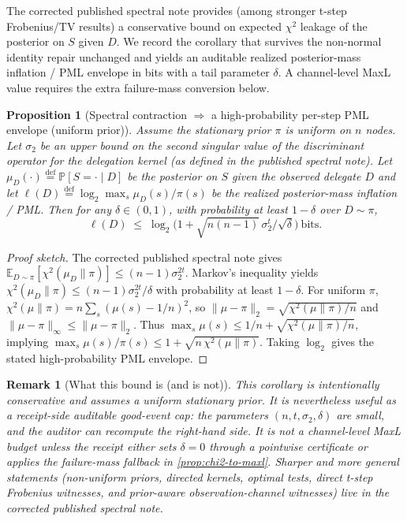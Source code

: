 \documentclass[11pt]{article}
\newtheorem{proposition}{Proposition}
\newtheorem{remark}{Remark}
\newcommand{\PP}{\mathbb{P}}
\newcommand{\EE}{\mathbb{E}}
\newcommand{\defeq}{\stackrel{\mathrm{def}}{=}}
\begin{document}
The corrected published spectral note provides (among stronger t-step Frobenius/TV results) a conservative bound on expected $\chi^2$ leakage of the posterior on $S$ given $D$.\cite{series:spectral}
We record the corollary that survives the non-normal identity repair unchanged and yields an auditable realized posterior-mass inflation / PML envelope in bits with a tail parameter $\delta$.  A channel-level MaxL value requires the extra failure-mass conversion below.

\begin{proposition}[Spectral contraction $\Rightarrow$ a high-probability per-step PML envelope (uniform prior)]
\label{prop:spectral-to-maxl}
Assume the stationary prior $\pi$ is uniform on $n$ nodes.
Let $\sigma_2$ be an upper bound on the second singular value of the discriminant operator for the delegation kernel (as defined in the published spectral note).\cite{series:spectral}
Let $\mu_D(\cdot)\defeq \PP[S=\cdot\mid D]$ be the posterior on $S$ given the observed delegate $D$ and let
$\ell(D)\defeq \log_2\max_s \mu_D(s)/\pi(s)$ be the realized posterior-mass inflation / PML.
Then for any $\delta\in(0,1)$, with probability at least $1-\delta$ over $D\sim\pi$,
\[
\ell(D)
\;\le\;
\log_2\!\Big(1+\sqrt{n(n-1)}\,\sigma_2^{t}/\sqrt{\delta}\Big)\ \text{bits}.
\]
\end{proposition}

\begin{proof}[Proof sketch]
The corrected published spectral note gives
$\EE_{D\sim\pi}\!\left[\chi^2(\mu_D\|\pi)\right]\le (n-1)\sigma_2^{2t}$.\cite{series:spectral}
Markov's inequality yields $\chi^2(\mu_D\|\pi)\le (n-1)\sigma_2^{2t}/\delta$ with probability at least $1-\delta$.
For uniform $\pi$, $\chi^2(\mu\|\pi)=n\sum_s(\mu(s)-1/n)^2$, so
$\|\mu-\pi\|_2 = \sqrt{\chi^2(\mu\|\pi)/n}$ and $\|\mu-\pi\|_\infty\le \|\mu-\pi\|_2$.
Thus $\max_s \mu(s)\le 1/n+\sqrt{\chi^2(\mu\|\pi)/n}$, implying
$\max_s \mu(s)/\pi(s)\le 1+\sqrt{n\,\chi^2(\mu\|\pi)}$.
Taking $\log_2$ gives the stated high-probability PML envelope.
\end{proof}

\begin{remark}[What this bound is (and is not)]
This corollary is intentionally conservative and assumes a uniform stationary prior.
It is nevertheless useful as a receipt-side \emph{auditable} good-event cap: the parameters $(n,t,\sigma_2,\delta)$ are small, and the auditor can recompute the right-hand side.  It is not a channel-level MaxL budget unless the receipt either sets $\delta=0$ through a pointwise certificate or applies the failure-mass fallback in \cref{prop:chi2-to-maxl}.
Sharper and more general statements (non-uniform priors, directed kernels, optimal tests, direct t-step Frobenius witnesses, and prior-aware observation-channel witnesses) live in the corrected published spectral note.\cite{series:spectral}
\end{remark}
\end{document}
